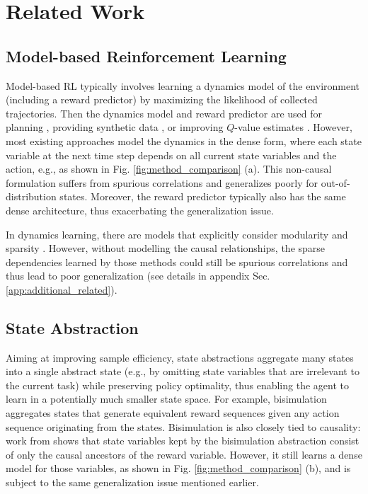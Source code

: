 \section{Related Work}
\label{sec:related}

\subsection{Model-based Reinforcement Learning}

Model-based RL typically involves learning a dynamics model of the environment (including a reward predictor) by maximizing the likelihood of collected trajectories. Then the dynamics model and reward predictor are used for planning \cite{williams2017information, chua2018deep, nagabandi2018neural}, providing synthetic data \cite{kurutach2018model, janner2019trust}, or improving $Q$-value estimates \cite{feinberg2018model, amos2021model}. However, most existing approaches model the dynamics in the dense form, where each state variable at the next time step depends on all current state variables and the action, e.g., as shown in Fig. \ref{fig:method_comparison} (a). This non-causal formulation suffers from spurious correlations and generalizes poorly for out-of-distribution states. Moreover, the reward predictor typically also has the same dense architecture, thus exacerbating the generalization issue.

In dynamics learning, there are models that explicitly consider modularity and sparsity \cite{goyal2019recurrent, goyal2020object, alias2021neural}. However, without modelling the causal relationships, the sparse dependencies learned by those methods could still be spurious correlations and thus lead to poor generalization (see details in appendix Sec. \ref{app:additional_related}).

\subsection{State Abstraction}
\label{subsec:state_abstraction}

Aiming at improving sample efficiency, state abstractions aggregate many states into a single abstract state (e.g., by omitting state variables that are irrelevant to the current task) while preserving policy optimality, thus enabling the agent to learn in a potentially much smaller state space. 
For example, bisimulation \cite{even2003approximate, ravindran2004algebraic, li2009unifying} aggregates states that generate equivalent reward sequences given any action sequence originating from the states. 
Bisimulation is also closely tied to causality: work from \citet{zhang2020invariant} shows that state variables kept by the bisimulation abstraction consist of only the causal ancestors of the reward variable. However, it still learns a dense model for those variables, as shown in Fig. \ref{fig:method_comparison} (b), and is subject to the same generalization issue mentioned earlier.

